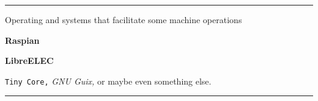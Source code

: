 
\hrule
\vskip 2in
\centerline{Operating and systems that facilitate some machine operations}
\vskip17pt
\centerline{\bf Raspian}
\vskip         8.5pt
\centerline{\bf LibreELEC}
\vskip17pt
\centerline{{\tt Tiny Core,} %
{\it GNU Guix,}
or maybe even something else.}
\vskip144pt
\hrule
\vfill\eject
